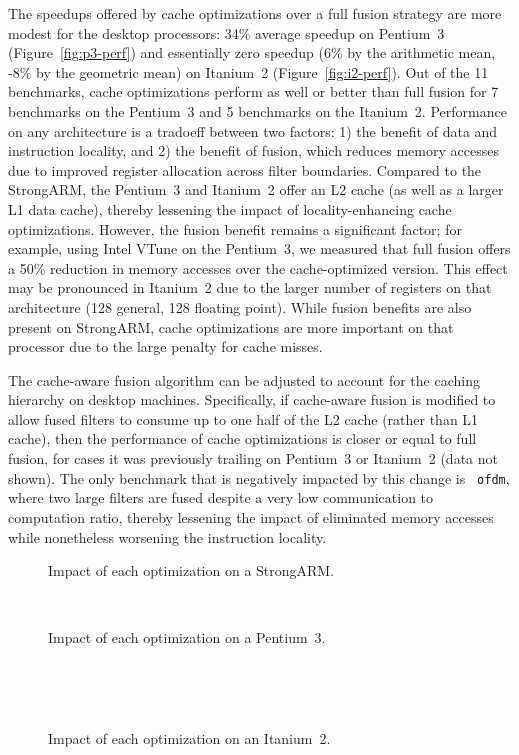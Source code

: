 The speedups offered by cache optimizations over a full fusion
strategy are more modest for the desktop processors: 34\% average
speedup on Pentium~3 (Figure~\ref{fig:p3-perf}) and essentially zero
speedup (6\% by the arithmetic mean, -8\% by the geometric mean) on
Itanium~2 (Figure~\ref{fig:i2-perf}).  Out of the 11 benchmarks, cache
optimizations perform as well or better than full fusion for 7
benchmarks on the Pentium~3 and 5 benchmarks on the Itanium~2.
Performance on any architecture is a tradoeff between two factors: 1)
the benefit of data and instruction locality, and 2) the benefit of
fusion, which reduces memory accesses due to improved register
allocation across filter boundaries.  Compared to the StrongARM, the
Pentium~3 and Itanium~2 offer an L2 cache (as well as a larger L1 data
cache), thereby lessening the impact of locality-enhancing cache
optimizations.  However, the fusion benefit remains a significant
factor; for example, using Intel VTune on the Pentium~3, we measured
that full fusion offers a 50\% reduction in memory accesses over the
cache-optimized version.  This effect may be pronounced in Itanium~2
due to the larger number of registers on that architecture (128
general, 128 floating point).  While fusion benefits are also present
on StrongARM, cache optimizations are more important on that processor
due to the large penalty for cache misses.

The cache-aware fusion algorithm can be adjusted to account for the
caching hierarchy on desktop machines.  Specifically, if cache-aware
fusion is modified to allow fused filters to consume up to one half of
the L2 cache (rather than L1 cache), then the performance of cache
optimizations is closer or equal to full fusion, for cases it was
previously trailing on Pentium~3 or Itanium~2 (data not shown).  The
only benchmark that is negatively impacted by this change is {\tt
ofdm}, where two large filters are fused despite a very low
communication to computation ratio, thereby lessening the impact of
eliminated memory accesses while nonetheless worsening the instruction
locality.

\begin{figure}
\nocaptionrule
\begin{minipage}{3.35in}
\vspace{-14pt}
\caption{Impact of each optimization on a StrongARM.\protect\label{fig:arm-perf2}}
~ \\

\vspace{-14pt}
\caption{Impact of each optimization on a Pentium~3.\protect\label{fig:p3-perf2}}
~ \\

\vspace{-14pt}
\caption{Impact of each optimization on an Itanium~2.\protect\label{fig:i2-perf2}}
~ \\
\end{minipage}
\end{figure}

